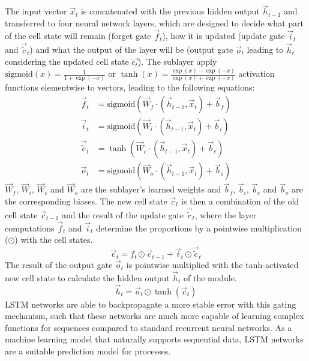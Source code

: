 The input vector $\vec{x}_t$ is concatenated with the previous hidden output $\vec{h}_{t-1}$ and transferred to four neural network layers, which are designed to decide what part of the cell state will remain (forget gate $\vec{f}_t$), how it is updated (update gate $\vec{i}_t$ and $\vec{\tilde{c}}_t$) and what the output of the layer will be (output gate $\vec{o}_t$ leading to $\vec{h}_t$ considering the updated cell state $\vec{c_t}$).
The sublayer apply $\text{sigmoid}(x) = \frac{1}{1+\exp({-x})}$ or $\tanh(x) = \frac{\exp({x}) - \exp({-x})}{\exp({x}) + \exp({-x})}$ activation functions elementwise to vectors, leading to the following equations:
\begin{align*}
\vec{f}_t & = \text{sigmoid}(\vec{W}_f \cdot (\vec{h}_{t-1}, \vec{x}_t) + \vec{b}_f) \\
\vec{i}_t & =  \text{sigmoid} (\vec{W}_i \cdot (\vec{h}_{t-1}, \vec{x}_t) + \vec{b}_i) \\
\vec{\tilde{c}}_t & = \tanh (\vec{W}_c \cdot (\vec{h}_{t-1}, \vec{x}_t) + \vec{b}_c) \\
\vec{o}_t & =  \text{sigmoid} (\vec{W}_o \cdot (\vec{h}_{t-1}, \vec{x}_t) + \vec{b}_o)
\end{align*}
$\vec{W}_f$, $\vec{W}_i$, $\vec{W}_c$ and $\vec{W}_o$ are the sublayer's learned weights and $\vec{b}_f$, $\vec{b}_i$, $\vec{b}_c$ and $\vec{b}_o$ are the corresponding biases.
The new cell state $\vec{c}_t$ is then a combination of the old cell state $\vec{c}_{t-1}$ and the result of the update gate $\vec{\tilde{c}}_t$, where the layer computations $\vec{f}_t$ and $\vec{i}_t$ determine the proportions by a pointwise multiplication ($\odot$) with the cell states.
\begin{equation*}
	\vec{c}_t = f_t \odot \vec{c}_{t-1} + \vec{i}_t \odot \vec{\tilde{c}}_t
\end{equation*}
The result of the output gate $\vec{o}_t$ is pointwise multiplied with the tanh-activated new cell state to calculate the hidden output $\vec{h}_t$ of the module.
\begin{equation*}
	\vec{h}_t = \vec{o}_t \odot \tanh(\vec{c}_t )
\end{equation*}
LSTM networks are able to backpropagate a more stable error with this gating mechanism, such that these networks are much more capable of learning complex functions for sequences compared to standard recurrent neural networks.
As a machine learning model that naturally supports sequential data, LSTM networks are a suitable prediction model for processes.